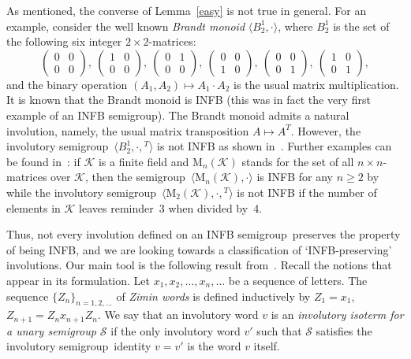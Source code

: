 \documentclass[11pt,reqno]{amsart}
\newcommand{\sgp}{semi\-group}
\newcommand{\is}{involutory semi\-group}
\begin{document}
As mentioned, the converse of Lemma~\ref{easy} is not true in general. For an example, consider the well known \emph{Brandt monoid}
$\langle B_2^1,\cdot\rangle$, where $B_2^1$ is the set of the following six integer $2\times 2$-matrices:
$$\begin{pmatrix} 0 & 0\\ 0 & 0\end{pmatrix},\
\begin{pmatrix} 1 & 0\\ 0 & 0\end{pmatrix},\
\begin{pmatrix} 0 & 1\\ 0 & 0\end{pmatrix},\
\begin{pmatrix} 0 & 0\\ 1 & 0\end{pmatrix},\
\begin{pmatrix} 0 & 0\\ 0 & 1\end{pmatrix},\
\begin{pmatrix} 1 & 0\\ 0 & 1\end{pmatrix},$$
and the binary operation $(A_1,A_2)\mapsto A_1\cdot A_2$ is the usual matrix multiplication. It is known
\cite[Corollary~6.1]{sapirburnside} that the Brandt monoid is INFB (this was in fact the very first example of an INFB \sgp). The Brandt
monoid admits a natural involution, namely, the usual matrix transposition $A\mapsto A^T$. However, the \is\ $\langle
B_2^1,\cdot,{}^T\rangle$ is not INFB as shown in~\cite{Sapir:1993}. Further examples can be found in~\cite{ADV:2012}: if $\mathcal{K}$ is a
finite field and $\mathrm{M}_n(\mathcal{K})$ stands for the set of all $n\times n$-matrices over $\mathcal{K}$, then the \sgp\
$\langle\mathrm{M}_n(\mathcal{K}),\cdot\rangle$ is INFB for any $n\ge 2$ by \cite[Corollary~6.2]{sapirburnside} while the \is\
$\langle\mathrm{M}_2(\mathcal{K}),\cdot,{}^T\rangle$ is not INFB if the number of elements in $\mathcal{K}$ leaves reminder~3 when divided
by~4.

Thus, not every involution defined on an INFB \sgp\ preserves the property of being INFB, and we are looking towards a classification of
`INFB-preserving' involutions. Our main tool is the following result from~\cite{ADV:2012}. Recall the notions that appear in its
formulation. Let $x_1,x_2,\dots,x_n,\dots$ be a sequence of letters. The sequence $\{Z_n\}_{n=1,2,\dots}$ of \emph{Zimin words} is defined
inductively by $Z_1=x_1$, $Z_{n+1}=Z_nx_{n+1}Z_n$. We say that an involutory word $v$ is an \emph{involutory isoterm for a unary semigroup
$\mathcal{S}$} if the only involutory word $v'$ such that $\mathcal{S}$ satisfies the \is\ identity $v=v'$ is the word $v$ itself.
\end{document}
